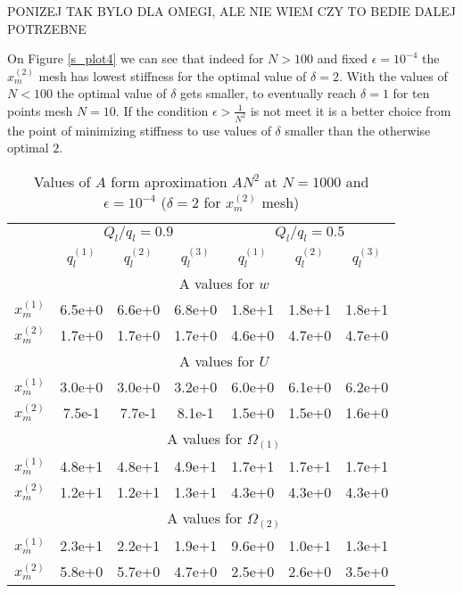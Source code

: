 PONIZEJ TAK BYLO DLA OMEGI, ALE NIE WIEM CZY TO BEDIE DALEJ POTRZEBNE

On Figure \ref{s_plot4} we can see that indeed for $N>100$ and fixed $\epsilon=10^{-4}$ the $x^{(2)}_m$  mesh has lowest stiffness for the optimal value of $\delta=2$. With the values of $N<100$ the optimal value of $\delta$ gets smaller, to eventually reach $\delta=1$ for ten points mesh $N=10$. If the condition $\epsilon>\frac{1}{N^2}$ is not meet it is a better choice from the point of minimizing stiffness to use values of $\delta$ smaller than the otherwise optimal $2$.

\begin{table}
\centering
\begin{tabular}{c| c@{}|c@{}|c@{}|c@{}|c@{}|c@{}|}
\cline{2-7}
& \multicolumn{3}{c|}{$Q_l/q_l=0.9$} & \multicolumn{3}{c|}{$Q_l/q_l=0.5$} \\ \cline{2-7}
& $q_l^{(1)}$ & $q_l^{(2)}$ & $q_l^{(3)}$ & $q_l^{(1)}$ & $q_l^{(2)}$ & $q_l^{(3)}$\\ \cline{2-7}
& \multicolumn{6}{c|}{A values for $w$ }\\ \cline{1-7}
\multicolumn{1}{|c|}{$x_m^{(1)}$} 
&6.5e+0&6.6e+0&6.8e+0&1.8e+1&1.8e+1&1.8e+1 \\ \cline{1-7} \multicolumn{1}{|c|}{$x_m^{(2)}$}
&1.7e+0&1.7e+0&1.7e+0&4.6e+0&4.7e+0&4.7e+0
  \\ \cline{1-7}
& \multicolumn{6}{c|}{A values for $U$ }\\ \cline{1-7}
\multicolumn{1}{|c|}{$x_m^{(1)}$} &3.0e+0&3.0e+0&3.2e+0&6.0e+0&6.1e+0&6.2e+0 \\ \cline{1-7} \multicolumn{1}{|c|}{$x_m^{(2)}$}
&7.5e-1&7.7e-1&8.1e-1&1.5e+0&1.5e+0&1.6e+0
  \\ \cline{1-7}
& \multicolumn{6}{c|}{A values for $\Omega_{(1)}$ }\\ \cline{1-7}
\multicolumn{1}{|c|}{$x_m^{(1)}$} 
&4.8e+1&4.8e+1&4.9e+1&1.7e+1&1.7e+1&1.7e+1 \\ \cline{1-7} \multicolumn{1}{|c|}{$x_m^{(2)}$}
&1.2e+1&1.2e+1&1.3e+1&4.3e+0&4.3e+0&4.3e+0
  \\ \cline{1-7}
& \multicolumn{6}{c|}{A values for $\Omega_{(2)}$ }\\ \cline{1-7}
\multicolumn{1}{|c|}{$x_m^{(1)}$} 
&2.3e+1&2.2e+1&1.9e+1&9.6e+0&1.0e+1&1.3e+1 \\ \cline{1-7} \multicolumn{1}{|c|}{$x_m^{(2)}$}
&5.8e+0&5.7e+0&4.7e+0&2.5e+0&2.6e+0&3.5e+0
  \\ \cline{1-7}
\end{tabular}
\caption{Values of $A$ form aproximation $AN^2$ at $N=1000$ and $\epsilon=10^{-4}$ ($\delta=2$ for $x_m^{(2)}$ mesh)}
\label{table_A}
\end{table}

